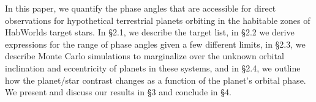 \documentclass[
    usenatbib,
]{mnras}
\begin{document}
In this paper, we quantify the phase angles that are accessible for direct
observations for hypothetical terrestrial planets orbiting in the habitable 
zones of HabWorlds target stars. 
In \S 2.1, we describe the target list, in \S 2.2 we derive expressions for the 
range of phase angles given a few different limits, in \S 2.3, we describe 
Monte Carlo simulations to marginalize over the unknown orbital inclination and 
eccentricity of planets in these systems, and in \S 2.4, we outline how the 
planet/star contrast changes as a function of the planet's orbital phase.  
We present and discuss our results in \S 3 and conclude in \S 4. 




 
\end{document}
